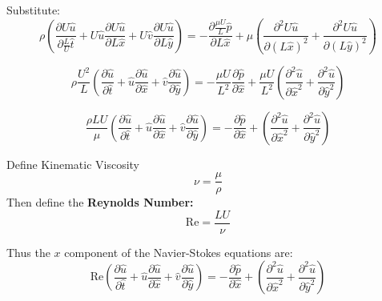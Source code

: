 \documentclass[12pt, a4paper, twoside, openright]{book}
\begin{document}
Substitute:
\begin{equation}
\rho \left( \frac{\partial U\hat{u}}{\partial \frac{L}{U}\hat{t}} +
U\hat{u} \frac{\partial U\hat{u}}{\partial L\hat{x}} +
U\hat{v} \frac{\partial U\hat{u}}{\partial L\hat{y}} \right) =
 - \frac{\partial \frac{\mu U}{L} \hat{p}}{\partial L\hat{x}} + 
\mu \left( \frac{\partial^2 U\hat{u}}{\partial (L\hat{x})^2} + 
\frac{\partial^2 U\hat{u}}{\partial (L\hat{y})^2} \right)
\end{equation}

\begin{equation}
\rho \frac{U^2}{L} \left( \frac{\partial \hat{u}}{\partial \hat{t}} +
\hat{u} \frac{\partial \hat{u}}{\partial \hat{x}} +
\hat{v} \frac{\partial \hat{u}}{\partial \hat{y}} \right) =
 - \frac{\mu U}{L^2} \frac{\partial \hat{p}}{\partial \hat{x}} + 
\frac{\mu U}{L^2} \left( \frac{\partial^2 \hat{u}}{\partial \hat{x}^2} + 
\frac{\partial^2 \hat{u}}{\partial \hat{y}^2} \right)
\end{equation}


\begin{equation}
\frac{\rho L U}{\mu} \left( \frac{\partial \hat{u}}{\partial \hat{t}} +
\hat{u} \frac{\partial \hat{u}}{\partial \hat{x}} +
\hat{v} \frac{\partial \hat{u}}{\partial \hat{y}} \right) =
 -  \frac{\partial \hat{p}}{\partial \hat{x}} + 
\left( \frac{\partial^2 \hat{u}}{\partial \hat{x}^2} + 
\frac{\partial^2 \hat{u}}{\partial \hat{y}^2} \right)
\end{equation}


\vspace{1em}
Define Kinematic Viscosity
\begin{equation}
\nu = \frac{\mu}{\rho}
\end{equation}
Then define the \textbf{Reynolds Number:}
\begin{equation}
\mathrm{Re} = \frac{L U}{\nu}
\end{equation}

Thus the $x$ component of the Navier-Stokes equations are:
\begin{equation}
\mathrm{Re} \left( \frac{\partial \hat{u}}{\partial \hat{t}} +
\hat{u} \frac{\partial \hat{u}}{\partial \hat{x}} +
\hat{v} \frac{\partial \hat{u}}{\partial \hat{y}} \right) =
 -  \frac{\partial \hat{p}}{\partial \hat{x}} + 
\left( \frac{\partial^2 \hat{u}}{\partial \hat{x}^2} + 
\frac{\partial^2 \hat{u}}{\partial \hat{y}^2} \right)
\end{equation}
\end{document}
